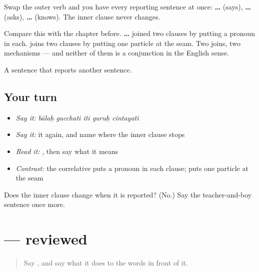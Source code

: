 \begin{grammarlens}[title={Grammar Lens: what a thinking verb thinks}]
Swap the outer verb and you have every reporting sentence at once: \textbf{…  } (says), \textbf{…  } (asks), \textbf{…  } (knows). The inner clause never changes.

Compare this with the chapter before. \textbf{ … } joined two clauses by putting a pronoun in each. \textbf{} joins two clauses by putting one particle at the seam. Two joins, two mechanisms — and neither of them is a conjunction in the English sense.
\end{grammarlens}

\begin{grammarlens}[title={What you've built}]
A sentence that reports another sentence.
\end{grammarlens}

\subsection*{Your turn}
\begin{itemize}
\raggedright
  \item \emph{Say it:} \emph{bālaḥ gacchati iti guruḥ cintayati}
  \item \emph{Say it:} it again, and name where the inner clause stops
  \item \emph{Read it:} \textbf{    }, then say what it means
  \item \emph{Contrast:} the correlative puts a pronoun in each clause; \textbf{} puts one particle at the seam
\end{itemize}

\begin{tcolorbox}[breakable,colback=teal!4,colframe=teal!35!black,title={Before you move on}]
Does the inner clause change when it is reported? (No.) Say the teacher-and-boy sentence once more.
\end{tcolorbox}
\section[\texorpdfstring{\sk{इति} (iti)}{इति (iti)}]{ — reviewed}

\label{lesson:SA-R54-iti}



\begin{quote}
Say \textbf{}, and say what it does to the words in front of it.
\end{quote}

